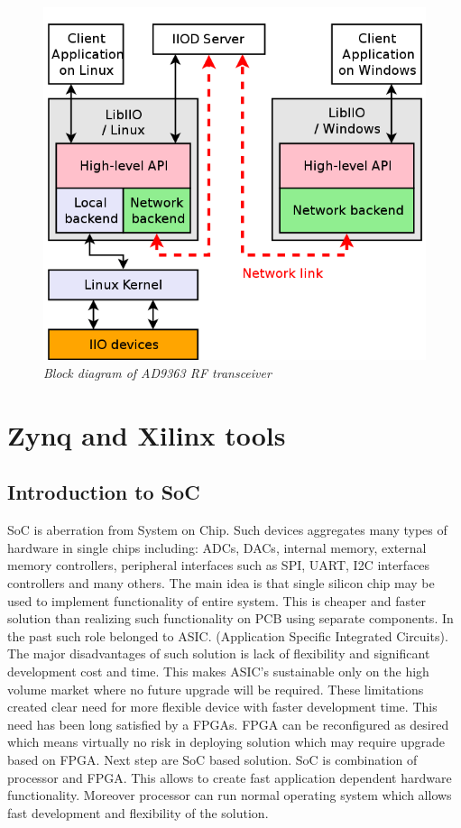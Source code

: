 \documentclass[en,printmode]{mgr}
\begin{document}
		
		\begin{figure}[!htb]
    		\centering
   			\includegraphics[width=\textwidth]{images/libiio_diagram.png}
   		 	\caption{\textit{Block diagram of AD9363 RF transceiver}}
		\end{figure}
		
		\newpage
	\section{Zynq and Xilinx tools}
		\subsection*{Introduction to SoC}
		SoC is aberration from System on Chip. Such devices aggregates
		many types of hardware in single chips including: ADCs, DACs, internal memory, external 
		memory controllers, peripheral interfaces such as SPI, UART, I2C
		interfaces controllers and many others. The main idea is that single silicon chip may be
		used to implement functionality of entire system. This is cheaper and faster solution than
		realizing such functionality on PCB using separate components. In the past such role
		belonged to ASIC.
		(Application Specific Integrated Circuits). The major disadvantages of such solution is lack
		of flexibility and significant development cost and time. This makes ASIC's sustainable only
		on the high volume market where no future upgrade will be required. These limitations created
		clear need for more flexible device with faster development time. This need has been long
		satisfied by a FPGAs. FPGA can be reconfigured as desired which means virtually no risk in
		deploying solution which may require upgrade based on FPGA. Next step are SoC based solution.
		SoC is combination of processor and FPGA. This allows to create fast application dependent
		hardware functionality. Moreover processor can run normal operating system which allows fast
		development and flexibility of the solution.
		
\end{document}
